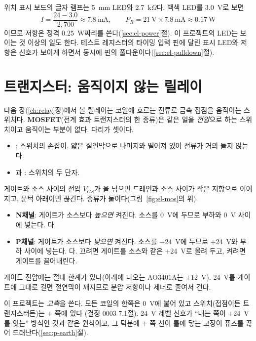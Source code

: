 \Ours 위치 표시 보드의 글자 램프는 5~mm LED와 2.7~k$\Omega$다. 백색 LED를 3.0~V로 보면
\[
  I = \frac{24 - 3.0}{2{,}700} \approx 7.8\ \text{mA}, \qquad P_R = 21\ \text{V} \times 7.8\ \text{mA} \approx 0.17\ \text{W}
\]
이므로 저항은 정격 0.25~W짜리를 쓴다(\ref{sec:el-power}절). 이 프로젝트의 LED는 보이는 것 이상의 일도 한다. 테스트
레지스터의 타이밍 입력 핀에 달린 표시 LED와 저항은 신호가 보이게 하면서 동시에 핀의 풀다운이다(\ref{sec:el-pulldown}절).

\section{트랜지스터: 움직이지 않는 릴레이}\label{sec:el-mosfet}

\Why 다음 장(\ref{ch:relay}장)에서 볼 릴레이는 코일에 흐르는 전류로 금속 접점을 움직이는 스위치다.
\textbf{MOSFET}(전계 효과 트랜지스터의 한 종류)은 같은 일을 \emph{전압}으로 하는 스위치이고 움직이는 부분이 없다.
다리가 셋이다.
\begin{itemize}
\item {}: 스위치의 손잡이. 얇은 절연막으로 나머지와 떨어져 있어 전류가 거의 들지 않는다.
\item {}과 : 스위치의 두 단자.
\end{itemize}
게이트와 소스 사이의 전압 $V_{GS}$가 을 넘으면 드레인과 소스 사이가 작은 저항으로 이어지고,
문턱 아래이면 끊긴다. 종류가 둘이다(그림~\ref{fig:el-mos}의 위).
\begin{itemize}
\item \textbf{N채널}: 게이트가 소스보다 \emph{높으면} 켜진다. 소스를 0~V에 두므로 부하와 0~V 사이에 넣는다.
다.
\item \textbf{P채널}: 게이트가 소스보다 \emph{낮으면} 켜진다. 소스를 +24~V에 두므로 +24~V와 부하 사이에 넣는다.
다. 끄려면 게이트를 소스와 같은 +24~V로 올려 두고, 켜려면 게이트를 끌어내린다.
\end{itemize}
게이트 전압에는 절대 한계가 있다(아래에 나오는 AO3401A는 $\pm 12$~V). 24~V를 게이트에 그대로 걸면 절연막이
깨지므로 분압 저항이나 제너로 줄여서 건다.

이 프로젝트는 \emph{고측}을 쓴다. 모든 코일의 한쪽은 0~V에 붙어 있고 스위치(접점이든 트랜지스터든)는 $+$ 쪽에 있다
(결정 0003 7.1절). 24~V 레벨 신호가 ``내는 쪽이 +24~V를 잇는'' 방식인 것과 같은 원칙이고, 그 덕분에 $+$ 쪽 선이
틀에 닿는 고장이 퓨즈를 끊어 드러난다(\ref{sec:p-earth}절).

